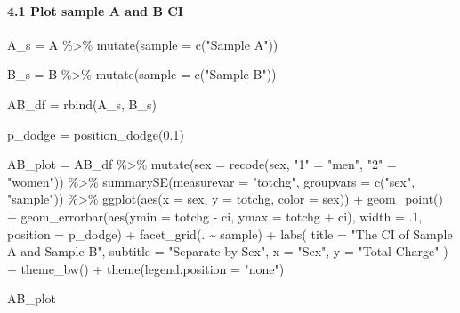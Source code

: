 \documentclass[
]{article}
\newenvironment{Shaded}{\begin{snugshade}}{\end{snugshade}}
\newcommand{\AttributeTok}[1]{\textcolor[rgb]{0.77,0.63,0.00}{#1}}
\newcommand{\DecValTok}[1]{\textcolor[rgb]{0.00,0.00,0.81}{#1}}
\newcommand{\FloatTok}[1]{\textcolor[rgb]{0.00,0.00,0.81}{#1}}
\newcommand{\FunctionTok}[1]{\textcolor[rgb]{0.00,0.00,0.00}{#1}}
\newcommand{\NormalTok}[1]{#1}
\newcommand{\OtherTok}[1]{\textcolor[rgb]{0.56,0.35,0.01}{#1}}
\newcommand{\SpecialCharTok}[1]{\textcolor[rgb]{0.00,0.00,0.00}{#1}}
\newcommand{\StringTok}[1]{\textcolor[rgb]{0.31,0.60,0.02}{#1}}
\begin{document}
\hypertarget{plot-sample-a-and-b-ci}{%
\paragraph{4.1 Plot sample A and B CI}\label{plot-sample-a-and-b-ci}}

\begin{Shaded}
\begin{Highlighting}[]
\NormalTok{A\_s }\OtherTok{=} 
\NormalTok{  A }\SpecialCharTok{\%\textgreater{}\%} 
  \FunctionTok{mutate}\NormalTok{(}\AttributeTok{sample =} \FunctionTok{c}\NormalTok{(}\StringTok{"Sample A"}\NormalTok{))}

\NormalTok{B\_s }\OtherTok{=} 
\NormalTok{  B }\SpecialCharTok{\%\textgreater{}\%} 
  \FunctionTok{mutate}\NormalTok{(}\AttributeTok{sample =} \FunctionTok{c}\NormalTok{(}\StringTok{"Sample B"}\NormalTok{))}

\NormalTok{AB\_df }\OtherTok{=} \FunctionTok{rbind}\NormalTok{(A\_s, B\_s)}

\NormalTok{p\_dodge }\OtherTok{=} \FunctionTok{position\_dodge}\NormalTok{(}\FloatTok{0.1}\NormalTok{)}

\NormalTok{AB\_plot }\OtherTok{=} 
\NormalTok{AB\_df }\SpecialCharTok{\%\textgreater{}\%} 
  \FunctionTok{mutate}\NormalTok{(}\AttributeTok{sex =} \FunctionTok{recode}\NormalTok{(sex, }\StringTok{"1"} \OtherTok{=} \StringTok{"men"}\NormalTok{, }\StringTok{"2"} \OtherTok{=} \StringTok{"women"}\NormalTok{)) }\SpecialCharTok{\%\textgreater{}\%} 
  \FunctionTok{summarySE}\NormalTok{(}\AttributeTok{measurevar =} \StringTok{"totchg"}\NormalTok{, }\AttributeTok{groupvars =} \FunctionTok{c}\NormalTok{(}\StringTok{"sex"}\NormalTok{, }\StringTok{"sample"}\NormalTok{)) }\SpecialCharTok{\%\textgreater{}\%} 
  \FunctionTok{ggplot}\NormalTok{(}\FunctionTok{aes}\NormalTok{(}\AttributeTok{x =}\NormalTok{ sex, }\AttributeTok{y =}\NormalTok{ totchg, }\AttributeTok{color =}\NormalTok{ sex)) }\SpecialCharTok{+}
  \FunctionTok{geom\_point}\NormalTok{() }\SpecialCharTok{+}
  \FunctionTok{geom\_errorbar}\NormalTok{(}\FunctionTok{aes}\NormalTok{(}\AttributeTok{ymin =}\NormalTok{ totchg }\SpecialCharTok{{-}}\NormalTok{ ci, }\AttributeTok{ymax =}\NormalTok{ totchg }\SpecialCharTok{+}\NormalTok{ ci), }\AttributeTok{width =}\NormalTok{ .}\DecValTok{1}\NormalTok{, }\AttributeTok{position =}\NormalTok{ p\_dodge) }\SpecialCharTok{+}
  \FunctionTok{facet\_grid}\NormalTok{(. }\SpecialCharTok{\textasciitilde{}}\NormalTok{ sample) }\SpecialCharTok{+}
  \FunctionTok{labs}\NormalTok{(}
    \AttributeTok{title =} \StringTok{"The CI of Sample A and Sample B"}\NormalTok{,}
    \AttributeTok{subtitle =} \StringTok{"Separate by Sex"}\NormalTok{,}
    \AttributeTok{x =} \StringTok{"Sex"}\NormalTok{,}
    \AttributeTok{y =} \StringTok{"Total Charge"}
\NormalTok{  ) }\SpecialCharTok{+}
  \FunctionTok{theme\_bw}\NormalTok{() }\SpecialCharTok{+}
  \FunctionTok{theme}\NormalTok{(}\AttributeTok{legend.position =} \StringTok{"none"}\NormalTok{)}

\NormalTok{AB\_plot}
\end{Highlighting}
\end{Shaded}
\end{document}
